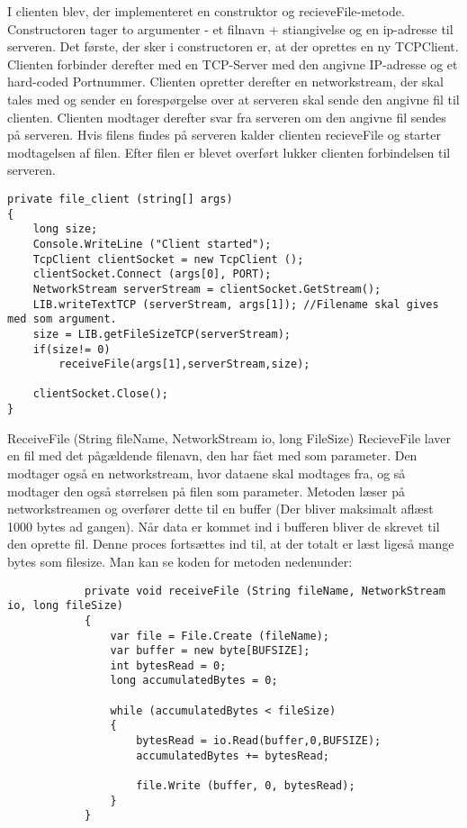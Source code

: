 I clienten blev, der implementeret en construktor og recieveFile-metode.
Constructoren tager to argumenter - et filnavn + stiangivelse og en ip-adresse til serveren.
Det første, der sker i constructoren er, at der oprettes en ny TCPClient. Clienten forbinder derefter med en TCP-Server med den angivne IP-adresse og et hard-coded Portnummer.
Clienten opretter derefter en networkstream, der skal tales med og sender en forespørgelse over at serveren skal sende den angivne fil til clienten. Clienten modtager derefter svar fra serveren om den angivne fil sendes på serveren. Hvis filens findes på serveren kalder clienten recieveFile og starter modtagelsen af filen.
Efter filen er blevet overført lukker clienten forbindelsen til serveren.
\begin{verbatim}
private file_client (string[] args)
{
	long size;
	Console.WriteLine ("Client started");
	TcpClient clientSocket = new TcpClient ();
	clientSocket.Connect (args[0], PORT);
	NetworkStream serverStream = clientSocket.GetStream();
	LIB.writeTextTCP (serverStream, args[1]); //Filename skal gives med som argument.
	size = LIB.getFileSizeTCP(serverStream);
	if(size!= 0)
		receiveFile(args[1],serverStream,size);

	clientSocket.Close();
}
\end{verbatim}

\noindent ReceiveFile (String fileName, NetworkStream io, long FileSize) 
RecieveFile laver en fil med det pågældende filenavn, den har fået med som parameter. Den modtager også en networkstream, hvor dataene skal modtages fra, og så modtager den også størrelsen på filen som parameter.
Metoden læser på networkstreamen og overfører dette til en buffer (Der bliver maksimalt aflæst 1000 bytes ad gangen). Når data er kommet ind i bufferen bliver de skrevet til den oprette fil. Denne proces fortsættes ind til, at der totalt er læst ligeså mange bytes som filesize.
Man kan se koden for metoden nedenunder:

\begin{verbatim}
			private void receiveFile (String fileName, NetworkStream io, long fileSize)
			{
				var file = File.Create (fileName);
				var buffer = new byte[BUFSIZE];
				int bytesRead = 0;
				long accumulatedBytes = 0;
			
				while (accumulatedBytes < fileSize) 
				{
					bytesRead = io.Read(buffer,0,BUFSIZE);
					accumulatedBytes += bytesRead;
			
					file.Write (buffer, 0, bytesRead);
				}
			}
\end{verbatim}
